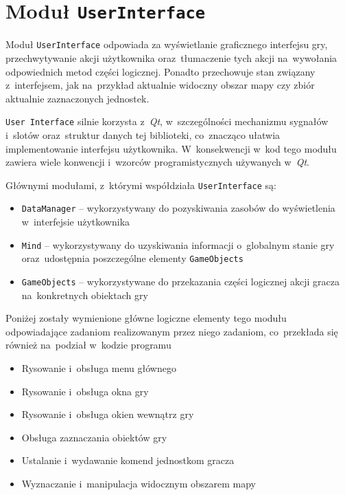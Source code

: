 \documentclass[licencjacka]{pracamgr}
\begin{document}
  \section{Moduł \texttt{UserInterface}}
    Moduł \texttt{UserInterface} odpowiada za wyświetlanie graficznego interfejsu gry, przechwytywanie akcji użytkownika
    oraz~tłumaczenie tych akcji na~wywołania odpowiednich metod części logicznej. Ponadto przechowuje stan związany
    z~interfejsem, jak na~przykład aktualnie widoczny obszar mapy czy zbiór aktualnie zaznaczonych jednostek.

    \texttt{User Interface} silnie korzysta z~\emph{Qt}, w~szczególności mechanizmu sygnałów i~slotów oraz~struktur danych
    tej biblioteki, co~znacząco ułatwia implementowanie interfejsu użytkownika. W~konsekwencji w~kod tego modułu zawiera wiele
    konwencji i~wzorców programistycznych używanych w~\emph{Qt}.

    Głównymi modułami, z~którymi współdziała \texttt{UserInterface} są:
    \begin{itemize}
     \item \texttt{DataManager} -- wykorzystywany do pozyskiwania zasobów do wyświetlenia w~interfejsie użytkownika
     \item \texttt{Mind} -- wykorzystywany do uzyskiwania informacji o~globalnym stanie gry oraz~udostępnia poszczególne elementy \texttt{GameObjects}
     \item \texttt{GameObjects} -- wykorzystywane do przekazania części logicznej akcji gracza na~konkretnych obiektach gry
    \end{itemize}

    Poniżej zostały wymienione główne logiczne elementy tego modułu odpowiadające zadaniom realizowanym przez niego zadaniom,
    co~przekłada się również na~podział w~kodzie programu

    \begin{itemize}
     \item Rysowanie i~obsługa menu głównego
     \item Rysowanie i~obsługa okna gry
     \item Rysowanie i~obsługa okien wewnątrz gry
     \item Obsługa zaznaczania obiektów gry
     \item Ustalanie i~wydawanie komend jednostkom gracza
     \item Wyznaczanie i~manipulacja widocznym obszarem mapy
    \end{itemize}
\end{document}
